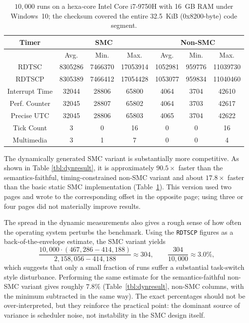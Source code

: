 \documentclass[11pt]{article}
\begin{document}
\begin{table}[t]
\centering
\small
\begin{tabular}{|c|c|c|c|c|c|c|}
\hline
Timer & \multicolumn{3}{c|}{SMC} & \multicolumn{3}{c|}{Non-SMC} \\ \hline
 & Avg. & Min. & Max. & Avg. & Min. & Max. \\ \hline
RDTSC & 8305286 & 7466370 & 17053914 & 1052981 & 959776 & 11039730 \\ \hline
RDTSCP & 8305389 & 7466412 & 17054428 & 1053077 & 959834 & 11040460 \\ \hline
Interrupt Time & 32044 & 28806 & 65800 & 4064 & 3704 & 42610 \\ \hline
Perf. Counter & 32045 & 28807 & 65802 & 4064 & 3703 & 42617 \\ \hline
Precise UTC & 32045 & 28806 & 65803 & 4065 & 3704 & 42622 \\ \hline
Tick Count & 3 & 0 & 16 & 0 & 0 & 16 \\ \hline
Multimedia & 3 & 1 & 7 & 0 & 0 & 4 \\ \hline
\end{tabular}
\caption{$10{,}000$ runs on a hexa-core Intel Core i7-9750H with 16~GB RAM under Windows~10; the checksum covered the entire 32.5~KiB (0x8200-byte) code segment.}
\label{tbl:staticresult}
\end{table}

The dynamically generated SMC variant is substantially more competitive.  As
shown in Table \ref{tbl:dynresult}, it is approximately $90.5\times$ faster than
the semantics-faithful, timing-constrained non-SMC variant and about $17.8\times$
faster than the basic static SMC implementation (Table~\ref{tbl:staticresult}).  This version used two pages and wrote
to the corresponding offset in the opposite page; using three or four pages did
not materially improve results.

The spread in the dynamic measurements also gives a rough sense of how often the
operating system perturbs the benchmark.  Using the \texttt{RDTSCP} figures as a
back-of-the-envelope estimate, the SMC variant yields
\[
\frac{10{,}000 \cdot (467{,}286 - 414{,}188)}{2{,}158{,}056 - 414{,}188} \approx 304,
\qquad
\frac{304}{10{,}000} \approx 3.0\%,
\]
which suggests that only a small fraction of runs suffer a substantial task-switch
style disturbance.  Performing the same estimate for the semantics-faithful
non-SMC variant gives roughly $7.8\%$ (Table~\ref{tbl:dynresult}, non-SMC columns, with the minimum subtracted in the same way).  The exact percentages should not be
over-interpreted, but they reinforce the practical point: the dominant source of
variance is scheduler noise, not instability in the SMC design itself.
\end{document}
